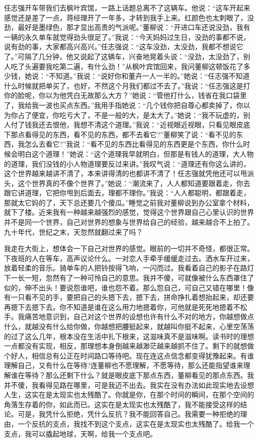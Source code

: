 \documentclass[12pt,oneside]{book}
\begin{document}
任志强开车带我们去枫叶宾馆，一路上话题总离不了这辆车。他说：``这车开起来感觉还是差了一点，蒋经理开了一年多，才转到我手上来。红颜色也太刺眼了，没劲，最好是墨绿色，那才显出高贵的气派呢。''董柳说：``开进口车还说没劲，我有一辆的永久单车就觉得劲头很足了。''我说：``今天妈妈过生日，没劲的事都不说，说有劲的事，大家都高兴高兴。''任志强说：``这车没劲，太没劲，我都不想说它了。''可隔了几分钟，他又说起了这辆车，兴奋地晃着头说：``没劲，太没劲了，别人吃了头遍要我吃第二遍，有什么劲！''从枫叶宾馆回来，我问董柳这顿饭花了多少钱，她说：``不知道。''我说：``说好你和董卉一人一半的。''她说：``任志强不知道什么时候就把单买了，也好，不然这个月我们都过不去了。''我说：``任志强这是打你的脸呢，你以为他凭白无故那么大方？''她说：``管他打什么，钱省在我口袋里了，我给我一波也买点东西。''我用手指她说：``几个钱你把自尊心都卖掉了，你以为你占了便宜，你吃亏大了，不是一般的大，是太大了。''她说：``我不玩虚的，别人付了钱我还去恨他，我想不清这个道理。''我说：``近视眼近视眼，只看见眼皮底下那点看得见的东西，看不见的东西，都不去看它?''董柳笑了说：``看不见的东西，我怎么去看它?''我说：``看不见的东西比看得见的东西更是个东西，你什么时候会明白这个道理！''她说：``这个道理我早就明白，但那是有钱人的道理，大人物的道理，我们没钱的小人物道理要反过来讲。''我叹气说：``道理还有你这么讲的，这个世界越来越讲不清了，本来讲得清的也都讲不清了！任志强就凭他还可以甩派头，这个世界真的不像个世界了。''她说：``潮流来了，人人都知道要跟着走，你去跟它讲道理，它把你甩到后面去，理都不理你。''我说：``人人都聪明，都跟着走，那就太它妈的了，天下总还要几个傻瓜。''睡觉之前我对董柳说到办公室拿个材料，就下了楼。近来我有一种越来越强烈的感觉，觉得这个世界跟自己心里认识的世界并不是同一个世界，自己对世界的想象与世界给自己的经验，越来越合不上拍了。九十年代，世纪之末，天忽然就翻过来了吗？

我走在大街上，想体会一下自己对世界的感觉。眼前的一切并不奇怪，都很正常。下夜班的人在等车，高声议论什么。一对恋人手牵手缓缓走过去。洒水车开过来，放着轻柔的音乐。骑单车的人把铃按得飞响，一闪而过。我看着自己的影子在路灯下一长一短，忽然有了一种可怜自己的意思。我并不傻，可就像被什么东西罩住了似的，伸不出头！要说怨谁吧，谁也怨不着。那么怨自己，可自己又错在哪里！像有一只看不见的手，要把自己的头摁下去，摁下去，拼命挣扎着想抬起来，却还要再摁下去摁下去。你不知道是谁在这么用力地摁着你，可他就是死死地摁着不松手。我痛苦地意识到，自己对这个世界的设想也许有什么不对的地方，你越想做点什么，就越没有什么给你做，你越想把腰挺起来，就越叫你挺不起来，心里空荡荡的过了这么几年，根本没在生活中扎下根来，这滋味真不是滋味啊。读书时的理想一点都没有实现，相反，那理想本身倒越来越渺茫越来越抓不住了。剩下的就想做个好人，相信总有公正在时间路口等待吧。现在连这点信念都变得犹豫起来。有谁理解自己，又有什么在等待?连董柳也不愿理解，不愿等待，那么还能指望谁来理解谁在等待？那么还剩下什么？就是眼皮底下那点东西，董柳看见的那点东西。我并不傻，我看得见路在哪里，可是我迈不出去。我实在没有办法如此现实地去设想人生，这实在是太现实也太残酷了。你就是你，在那个时间的瞬间，在那个空间的角落生存着的你，如此而已。这实在是太现实也太残酷了，我不能接受这样的结论。可是，我凭什么拒绝，凭什么反抗？我不能回答自己。我需要一种拒绝的理由，一个反抗的支点，我找不到这个支点，这实在是太现实也太残酷了。给我一个支点，我可以撬起地球，天啊，给我一个支点吧。
\end{document}
